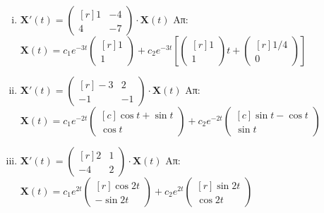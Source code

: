 \begin{enumerate}
\begin{enumerate}[i)]
      \item $ \mathbf{X}'(t) = 
        \begin{pmatrix*}[r]
          1 & -4 \\
          4 & -7
        \end{pmatrix*} \cdot
        \mathbf{X}(t) $ 
        \hfill Απ: {\scriptsize $ \mathbf{X}(t) = c_{1}e^{-3t} 
          \begin{pmatrix*}[r] 1 \\ 1 \end{pmatrix*} + c_{2}e^{-3t} \left[
            \begin{pmatrix*}[r] 1 \\ 1 \end{pmatrix*} t + 
        \begin{pmatrix*}[r] 1/4 \\ 0 \end{pmatrix*}  \right] $}

      \item $ \mathbf{X}'(t) = 
        \begin{pmatrix*}[r]
          -3 & 2 \\
          -1 & -1
        \end{pmatrix*} \cdot 
        \mathbf{X}(t) $
        \hfill Απ: {\scriptsize $ \mathbf{X}(t) = c_{1}e^{-2t} 
          \begin{pmatrix*}[c] \cos{t} + \sin{t} \\ \cos{t} \end{pmatrix*} + c_{2}e^{-2t} 
        \begin{pmatrix*}[c] \sin{t} - \cos{t} \\ \sin{t} \end{pmatrix*} $}

      \item $ \mathbf{X}'(t) = 
        \begin{pmatrix*}[r]
          2 & 1 \\
          -4 & 2
        \end{pmatrix*} \cdot 
        \mathbf{X}(t) $
        \hfill Απ: {\scriptsize $ \mathbf{X}(t) = c_{1}e^{2t} 
          \begin{pmatrix*}[r] \cos{2t} \\ -\sin{2t} \end{pmatrix*} + c_{2}e^{2t} 
        \begin{pmatrix*}[r] \sin{2t} \\ \cos{2t}  \end{pmatrix*} $}
    \end{enumerate}


\end{enumerate}
